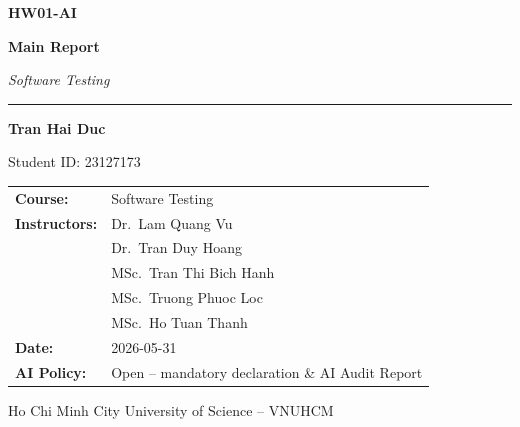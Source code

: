 \documentclass[12pt, a4paper]{article}
\begin{document}
\setlength{\parskip}{5pt}

\begin{titlepage}
\pagecolor{PrimaryBlue}
\color{white}
\centering
\vspace*{3cm}

{\fontsize{36}{44}\bfseries HW01-AI\par}
\vspace{0.3cm}
{\fontsize{20}{26}\bfseries Main Report\par}
\vspace{0.5cm}
{\large\itshape Software Testing\par}

\vspace{1.5cm}
\color{white!70!PrimaryBlue}\rule{10cm}{0.8pt}\color{white}
\vspace{1.5cm}

{\Large\bfseries Tran Hai Duc\par}
\vspace{0.3cm}
{\large Student ID: 23127173\par}

\vspace{2cm}

\begin{tabular}{@{}ll@{}}
\textbf{Course:}      & Software Testing \\[4pt]
\textbf{Instructors:} & Dr.\ Lam Quang Vu \\
                      & Dr.\ Tran Duy Hoang \\
                      & MSc.\ Tran Thi Bich Hanh \\
                      & MSc.\ Truong Phuoc Loc \\
                      & MSc.\ Ho Tuan Thanh \\[4pt]
\textbf{Date:}        & 2026-05-31 \\[4pt]
\textbf{AI Policy:}   & Open -- mandatory declaration \& AI Audit Report \\
\end{tabular}

\vfill
{\small Ho Chi Minh City University of Science -- VNUHCM\par}
\end{titlepage}
\nopagecolor

\tableofcontents
\newpage

\end{document}
